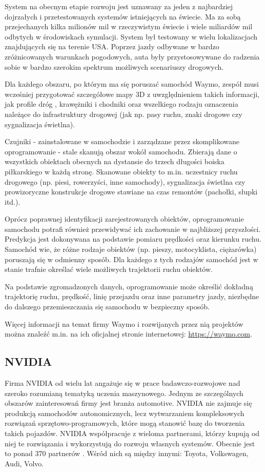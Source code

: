 System na obecnym etapie rozwoju jest uznawany za jeden z najbardziej dojrzałych i przetestowanych systemów istniejących na świecie. Ma za sobą przejechanych kilka milionów mil w rzeczywistym świecie i wiele miliardów mil odbytych w środowiskach symulacji. System był testowany w wielu lokalizacjach znajdujących się na terenie USA. Poprzez jazdy odbywane w bardzo zróżnicowanych warunkach pogodowych, auta były przystosowywane do radzenia sobie w bardzo szerokim spektrum możliwych scenariuszy drogowych.

Dla każdego obszaru, po którym ma się poruszać samochód Waymo, zespół musi wcześniej przygotować szczegółowe mapy 3D z uwzględnieniem takich informacji, jak profile dróg \cite{wikipedia:designOfRoads}, krawężniki i chodniki oraz wszelkiego rodzaju oznaczenia należące do infrastruktury drogowej (jak np. pasy ruchu, znaki drogowe czy sygnalizacja świetlna).

Czujniki - zainstalowane w samochodzie i zarządzane przez skomplikowane oprogramowanie - stale skanują obszar wokół samochodu. Zbierają dane o wszystkich obiektach obecnych na dystansie do trzech długości boiska piłkarskiego w każdą stronę. Skanowane obiekty to m.in. uczestnicy ruchu drogowego (np. piesi, rowerzyści, inne samochody), sygnalizacja świetlna czy prowizoryczne konstrukcje drogowe stawiane na czas remontów (pachołki, słupki itd.).

Oprócz poprawnej identyfikacji zarejestrowanych obiektów, oprogramowanie samochodu potrafi również przewidywać ich zachowanie w najbliższej przyszłości. Predykcja jest dokonywana na podstawie pomiaru prędkości oraz kierunku ruchu.
Samochód wie, że różne rodzaje obiektów (np. pieszy, motocyklista, ciężarówka) poruszają się w odmienny sposób. Dla każdego z tych rodzajów samochód jest w stanie trafnie określać wiele możliwych trajektorii ruchu obiektów.

Na podstawie zgromadzonych danych, oprogramowanie może określić dokładną trajektorię ruchu, prędkość, linię przejazdu oraz inne parametry jazdy, niezbędne do dalszego przemieszczania się samochodu w bezpieczny sposób.

Więcej informacji na temat firmy Waymo i rozwijanych przez nią projektów można znaleźć m.in. na ich oficjalnej stronie internetowej: \url{https://waymo.com}.

\subsection{NVIDIA}
Firma NVIDIA od wielu lat angażuje się w prace badawczo-rozwojowe nad szeroko rozumianą tematyką uczenia maszynowego. Jednym ze szczególnych obszarów zainteresowań firmy jest branża automotive.
NVIDIA nie zajmuje się produkcją samochodów autonomicznych, lecz wytwarzaniem kompleksowych rozwiązań sprzętowo-programowych, które mogą stanowić bazę do tworzenia takich pojazdów. NVIDIA współpracuje z wieloma partnerami, którzy kupują od niej te rozwiązania i wykorzystują do rozwoju własnych systemów. Obecnie jest to ponad 370 partnerów \cite{nvidia:partners}. Wśród nich są między innymi: Toyota, Volkswagen, Audi, Volvo.

